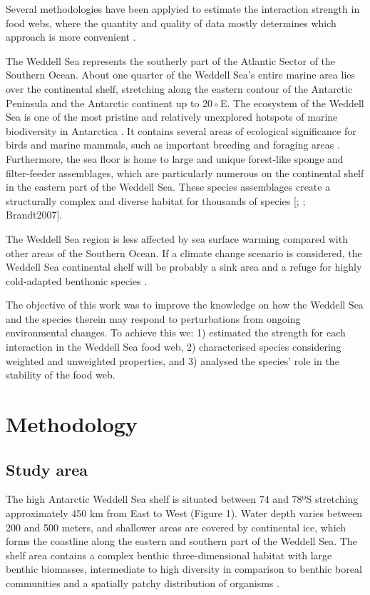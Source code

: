 \documentclass[gc, manuscript]{copernicus}
\begin{document}
Several methodologies have been applyied to estimate the interaction
strength in food webs, where the quantity and quality of data mostly
determines which approach is more convenient \citep{Berlow2004}.

The Weddell Sea represents the southerly part of the Atlantic Sector of
the Southern Ocean. About one quarter of the Weddell Sea's entire marine
area lies over the continental shelf, stretching along the eastern
contour of the Antarctic Peninsula and the Antarctic continent up to
20◦E. The ecosystem of the Weddell Sea is one of the most pristine and
relatively unexplored hotspots of marine biodiversity in Antarctica
\citep{Teschke2021}. It contains several areas of ecological
significance for birds and marine mammals, such as important breeding
and foraging areas \citep{Hindell2020}. Furthermore, the sea floor is
home to large and unique forest-like sponge and filter-feeder
assemblages, which are particularly numerous on the continental shelf in
the eastern part of the Weddell Sea. These species assemblages create a
structurally complex and diverse habitat for thousands of species
{[}\citet{Barthel1992}; \citet{Brey1994}; Brandt2007{]}.

The Weddell Sea region is less affected by sea surface warming compared
with other areas of the Southern Ocean. If a climate change scenario is
considered, the Weddell Sea continental shelf will be probably a sink
area and a refuge for highly cold-adapted benthonic species
\citep{Griffiths2017}.

The objective of this work was to improve the knowledge on how the
Weddell Sea and the species therein may respond to perturbations from
ongoing environmental changes. To achieve this we: 1) estimated the
strength for each interaction in the Weddell Sea food web, 2)
characterised species considering weighted and unweighted properties,
and 3) analysed the species' role in the stability of the food web.

\section{Methodology}

\subsection{Study area}

The high Antarctic Weddell Sea shelf is situated between 74 and 78ºS
stretching approximately 450 km from East to West (Figure 1). Water
depth varies between 200 and 500 meters, and shallower areas are covered
by continental ice, which forms the coastline along the eastern and
southern part of the Weddell Sea. The shelf area contains a complex
benthic three-dimensional habitat with large benthic biomasses,
intermediate to high diversity in comparison to benthic boreal
communities and a spatially patchy distribution of organisms
\citep{Dayton1990, Teixido2002}.
\end{document}

